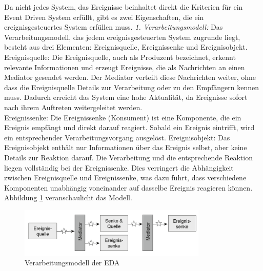 \documentclass[a4paper,12pt]{article}
\begin{document}
Da nicht jedes System, das Ereignisse beinhaltet direkt die Kriterien für ein Event Driven System erfüllt, gibt es zwei Eigenschaften, die ein ereignisgesteuertes System erfüllen muss. \newline
\textit{1. Verarbeitungsmodell:} \newline
Das Verarbeitungsmodell, das jedem ereignisgesteuerten System zugrunde liegt, besteht aus drei Elementen: Ereignisquelle, Ereignissenke und Ereignisobjekt.\\
Ereignisquelle: Die Ereignisquelle, auch als Produzent bezeichnet, erkennt relevante Informationen und erzeugt Ereignisse, die als Nachrichten an einen Mediator gesendet werden. Der Mediator verteilt diese Nachrichten weiter, ohne dass die Ereignisquelle Details zur Verarbeitung oder zu den Empfängern kennen muss. Dadurch erreicht das System eine hohe Aktualität, da Ereignisse sofort nach ihrem Auftreten weitergeleitet werden.\\
Ereignissenke: Die Ereignissenke (Konsument) ist eine Komponente, die ein Ereignis empfängt und direkt darauf reagiert. Sobald ein Ereignis eintrifft, wird ein entsprechender Verarbeitungsvorgang ausgelöst.
Ereignisobjekt: Das Ereignisobjekt enthält nur Informationen über das Ereignis selbst, aber keine Details zur Reaktion darauf. Die Verarbeitung und die entsprechende Reaktion liegen vollständig bei der Ereignissenke. Dies verringert die Abhängigkeit zwischen Ereignisquelle und Ereignissenke, was dazu führt, dass verschiedene Komponenten unabhängig voneinander auf dasselbe Ereignis reagieren können. \cite[S. 51f]{Bruns2010} \newline
Abbildung \ref{fig:Verarbeitungsmodell} veranschaulicht das Modell. 

\begin{figure}[h]
    \centering
    \includegraphics[width=0.8\textwidth]{images/Verarbeitungsmodell.png}
    \caption{Verarbeitungsmodell der \ac{EDA} \cite[S. 52]{Bruns2010}}
    \label{fig:Verarbeitungsmodell}
\end{figure}
\end{document}
